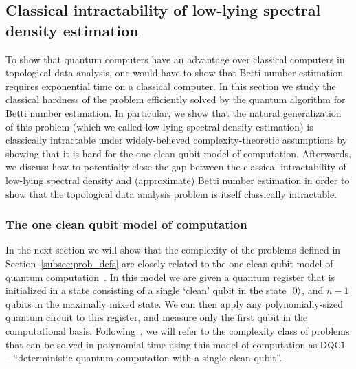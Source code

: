 \documentclass[a4paper, onecolumn, accepted=2022-08-28]{quantumarticle}
\begin{document}
\subsection{Classical intractability of low-lying spectral density estimation}
\label{subsec:hardness_lled}

To show that quantum computers have an advantage over classical computers in topological data analysis, one would have to show that Betti number estimation requires exponential time on a classical computer.
In this section we study the classical hardness of the problem efficiently solved by the quantum algorithm for Betti number estimation.
In particular, we show that the natural generalization of this problem (which we called low-lying spectral density estimation) is classically intractable under widely-believed complexity-theoretic assumptions by showing that it is hard for the one clean qubit model of computation.
Afterwards, we discuss how to potentially close the gap between the classical intractability of low-lying spectral density and (approximate) Betti number estimation in order to show that the topological data analysis problem is itself classically intractable. 

\subsubsection{The one clean qubit model of computation}
\label{subsubsec:dqc1}

In the next section we will show that the complexity of the problems defined in Section~\ref{subsec:prob_defs} are closely related to the one clean qubit model of quantum computation~\cite{knill:dqc1}.
In this model we are given a quantum register that is initialized in a state consisting of a single `clean' qubit in the state $\ket{0}$, and $n-1$ qubits in the maximally mixed state.
We can then apply any polynomially-sized quantum circuit to this register, and measure only the first qubit in the computational basis.
Following~\cite{knill:dqc1}, we will refer to the complexity class of problems that can be solved in polynomial time using this model of computation as $\mathsf{DQC1}$ -- ``deterministic quantum computation with a single clean qubit''.
\end{document}
